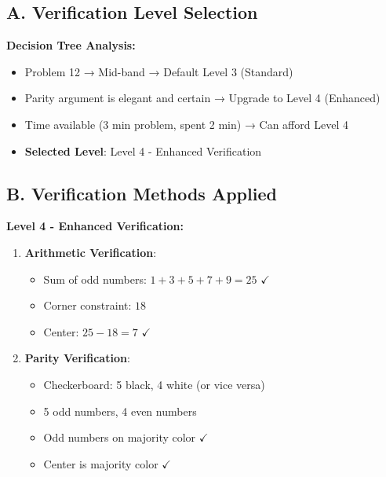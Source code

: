 \documentclass[11pt]{article}
\begin{document}
\begin{verificationbox}
\subsection*{A. Verification Level Selection}

\textbf{Decision Tree Analysis:}
\begin{itemize}[leftmargin=*]
    \item Problem 12 → Mid-band → Default Level 3 (Standard)
    \item Parity argument is elegant and certain → Upgrade to Level 4 (Enhanced)
    \item Time available (3 min problem, spent 2 min) → Can afford Level 4
    \item \textbf{Selected Level}: Level 4 - Enhanced Verification
\end{itemize}

\subsection*{B. Verification Methods Applied}

\textbf{Level 4 - Enhanced Verification:}
\begin{enumerate}[leftmargin=*]
    \item \textbf{Arithmetic Verification}:
    \begin{itemize}
        \item Sum of odd numbers: $1+3+5+7+9=25$ $\checkmark$
        \item Corner constraint: $18$
        \item Center: $25-18=7$ $\checkmark$
    \end{itemize}
    
    \item \textbf{Parity Verification}:
    \begin{itemize}
        \item Checkerboard: 5 black, 4 white (or vice versa)
        \item 5 odd numbers, 4 even numbers
        \item Odd numbers on majority color $\checkmark$
        \item Center is majority color $\checkmark$
    \end{itemize}
    

\end{enumerate}
\end{verificationbox}
\end{document}
